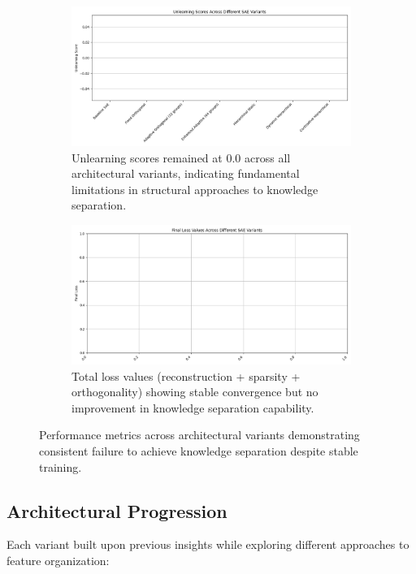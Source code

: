 \documentclass{article} %
\begin{document}
\begin{figure}[h]
    \centering
    \begin{subfigure}{0.49\textwidth}
        \includegraphics[width=\textwidth]{unlearning_scores.png}
        \caption{Unlearning scores remained at 0.0 across all architectural variants, indicating fundamental limitations in structural approaches to knowledge separation.}
        \label{fig:unlearning}
    \end{subfigure}
    \hfill
    \begin{subfigure}{0.49\textwidth}
        \includegraphics[width=\textwidth]{final_losses.png}
        \caption{Total loss values (reconstruction + sparsity + orthogonality) showing stable convergence but no improvement in knowledge separation capability.}
        \label{fig:losses}
    \end{subfigure}
    \caption{Performance metrics across architectural variants demonstrating consistent failure to achieve knowledge separation despite stable training.}
    \label{fig:main_results}
\end{figure}

\subsection{Architectural Progression}
Each variant built upon previous insights while exploring different approaches to feature organization:
\end{document}
